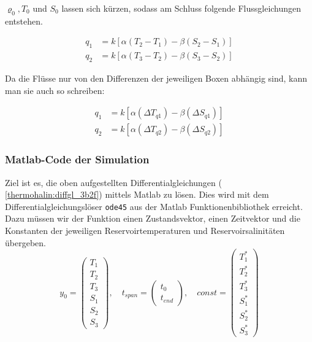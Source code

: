 $\varrho_0, T_0$ und $S_0$ lassen sich kürzen, sodass am Schluss folgende Flussgleichungen entstehen.

\begin{equation}
\begin{aligned}
 q_1 &= k[\alpha(T_2-T_1)-\beta(S_2-S_1)] 
 \\
 q_2 &= k[\alpha(T_3-T_2)-\beta(S_3-S_2)]
\end{aligned}
\end{equation}

Da die Flüsse nur von den Differenzen der jeweiligen Boxen abhängig sind, kann man sie auch so schreiben:

\begin{equation}
\begin{aligned}
q_1 &= k[\alpha(\Delta T_{q1})-\beta(\Delta S_{q1})] 
\\
q_2 &= k[\alpha(\Delta T_{q2})-\beta(\Delta S_{q2})]
\end{aligned}
\end{equation}

\subsubsection{Matlab-Code der Simulation}

Ziel ist es, die oben aufgestellten Differentialgleichungen ( \ref{thermohalin:diffgl_3b2f}) mittels Matlab zu lösen. Dies wird mit dem Differentialgleichungslöser \texttt{ode45} aus der Matlab Funktionenbibliothek erreicht.
Dazu müssen wir der Funktion einen Zustandsvektor, einen Zeitvektor und die Konstanten der jeweiligen Reservoirtemperaturen und Reservoirsalinitäten übergeben.
\begin{equation*}
y_0 = \begin{pmatrix}T_{1} \\ T_{2} \\ T_{3} \\ S_{1} \\ S_{2} \\ S_{3}\end{pmatrix}, \quad
t_{span} = \begin{pmatrix}t_0 \\ t_{end} \end{pmatrix}, \quad
const = \begin{pmatrix}T_{1}^{*} \\ T_{2}^{*} \\ T_{3}^{*} \\ S_{1}^{*} \\ S_{2}^{*} \\ S_{3}^{*}\end{pmatrix}
\end{equation*}




